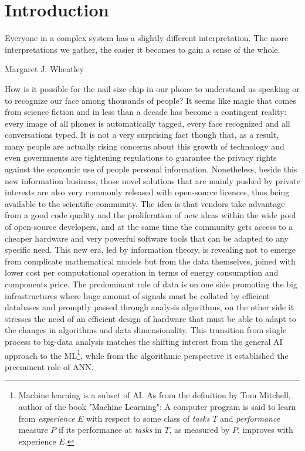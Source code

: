 



\chapter{Introduction}

\epigraph{Everyone in a complex system has a slightly different interpretation. The more interpretations we gather, the easier it becomes to gain a sense of the whole.}{Margaret J. Wheatley}


How is it possible for the nail size chip in our phone to understand us speaking or to recognize our face among thousands of people? 
It seems like magic that comes from science fiction and in less than a decade has become a contingent reality: every image of all phones is automatically tagged, every face recognized and all conversations typed.
It is not a very surprising fact though that, as a result, many people are actually rising concerns about this growth of technology and even governments are tightening regulations to guarantee the privacy rights against the economic use of people personal information.
%
Nonetheless, beside this new information business, those novel solutions that are mainly pushed by private interests are also very commonly released with open-source licences, thus being available to the scientific community. The idea is that vendors take advantage from a good code quality and the proliferation of new ideas within the wide pool of open-source developers, and at the same time the community gets access to a cheaper hardware and very powerful software tools that can be adapted to any specific need.
%
This new era, led by information theory, is revealing not to emerge from complicate mathematical models but from the data themselves, joined with lower cost per computational operation in terms of energy consumption and components price. %
The predominant role of data is on one side promoting the big infrastructures where huge amount of signals must be collated by efficient databases and promptly passed through analysis algorithms, on the other side it stresses the need of an efficient design of hardware that must be able to adapt to the changes in algorithms and data dimensionality. This transition from single process to big-data analysis matches the shifting interest from the general \ac{AI} approach to the \ac{ML}\footnote{Machine learning is a subset of \acs{AI}. As from the definition by Tom Mitchell, author of the book "Machine Learning": A computer program is said to learn from \textit{experience} $E$ with respect to some class of \textit{tasks} $T$ and \textit{performance} measure $P$ if its performance at \textit{tasks} in $T$, as measured by $P$, improves with experience $E$.}, while from the algorithmic perspective it established the preeminent role of \ac{ANN}.

